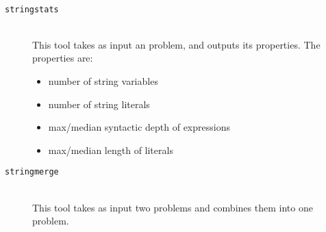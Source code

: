 \begin{description}
            \hfill \\

        \item[\texttt{stringstats}] \hfill \\
            This tool takes as input an \smt{} problem, and outputs its properties. The properties are:

            \begin{itemize}
                \item number of string variables
                \item number of string literals
                \item max/median syntactic depth of expressions
                \item max/median length of literals
            \end{itemize}

            \hfill

        \item[\texttt{stringmerge}] \hfill \\
            This tool takes as input two \smt{} problems and combines them into one problem.

    \end{description}

